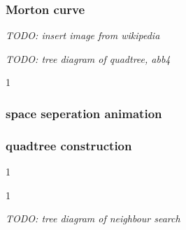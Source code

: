 \documentclass{beamer}
\begin{document}
\begin{frame}
    \frametitle{Morton curve}
    \textit{TODO: insert image from wikipedia}
\end{frame}


\begin{frame}
    \resizebox{\textwidth}{!}{%
        
    }
\end{frame}


\begin{frame}
    \resizebox{\textwidth}{!}{%
        
    }
\end{frame}


\begin{frame}
    \textit{TODO: tree diagram of quadtree, abb4}
\end{frame}


\begin{frame}
\begin{animateinline}[%
    controls={step},
    buttonsize=10pt
]{1}
\end{animateinline}
\end{frame}


\begin{frame}
    \frametitle{space seperation animation}
    \begin{center}
    \end{center}
\end{frame}


\begin{frame}
    \frametitle{quadtree construction}
    \begin{center}
    \end{center}
\end{frame}


\begin{frame}
\begin{animateinline}[%
    controls={step},
    buttonsize=10pt
]{1}
\end{animateinline}
\end{frame}


\begin{frame}
\begin{animateinline}[%
    controls={step},
    buttonsize=10pt
]{1}
\end{animateinline}
\end{frame}


\begin{frame}
    \textit{TODO: tree diagram of neighbour search}
\end{frame}
\end{document}
